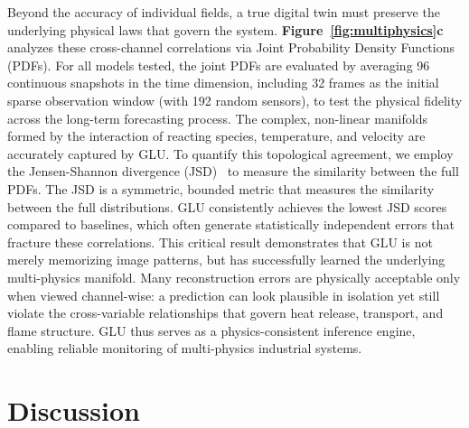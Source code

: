 \documentclass[pdflatex,sn-nature]{sn-jnl}%
\begin{document}
Beyond the accuracy of individual fields, a true digital twin must preserve the underlying physical laws that govern the system.  
\textbf{Figure~\ref{fig:multiphysics}c} analyzes these cross-channel correlations via Joint Probability Density Functions (PDFs). 
For all models tested, the joint PDFs are evaluated by averaging 96 continuous snapshots in the time dimension, including 32 frames as the initial sparse observation window (with 192 random sensors), to test the physical fidelity across the long-term forecasting process.
The complex, non-linear manifolds formed by the interaction of reacting species, temperature, and velocity are accurately captured by GLU.
To quantify this topological agreement, we employ the Jensen-Shannon divergence (JSD)~\cite{NEURIPS2021_fe2d0103} to measure the similarity between the full PDFs. 
The JSD is a symmetric, bounded metric that measures the similarity between the full distributions. 
GLU consistently achieves the lowest JSD scores compared to baselines, which often generate statistically independent errors that fracture these correlations. 
This critical result demonstrates that GLU is not merely memorizing image patterns, but has successfully learned the underlying multi-physics manifold. 
Many reconstruction errors are physically acceptable only when viewed channel-wise: a prediction can look plausible in isolation yet still violate the cross-variable relationships that govern heat release, transport, and flame structure.
GLU thus serves as a physics-consistent inference engine, enabling reliable monitoring of multi-physics industrial systems.


\section*{Discussion}
\label{sec: Discussion}
\end{document}
